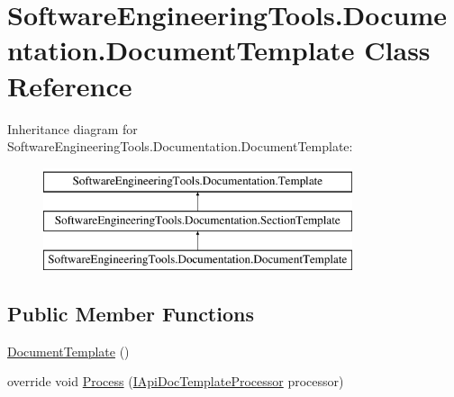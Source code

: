 \hypertarget{class_software_engineering_tools_1_1_documentation_1_1_document_template}{\section{Software\+Engineering\+Tools.\+Documentation.\+Document\+Template Class Reference}
\label{class_software_engineering_tools_1_1_documentation_1_1_document_template}
}
Inheritance diagram for Software\+Engineering\+Tools.\+Documentation.\+Document\+Template\+:\begin{figure}[H]
\begin{center}
\leavevmode
\includegraphics[height=3.000000cm]{class_software_engineering_tools_1_1_documentation_1_1_document_template}
\end{center}
\end{figure}
\subsection*{Public Member Functions}
\begin{DoxyCompactItemize}
\item 
\hyperlink{class_software_engineering_tools_1_1_documentation_1_1_document_template_a09ce6109fced0fda2af6f076a075fad6}{Document\+Template} ()
\item 
override void \hyperlink{class_software_engineering_tools_1_1_documentation_1_1_document_template_acaca4259f80cb3ee1b853f16c1965f04}{Process} (\hyperlink{interface_software_engineering_tools_1_1_documentation_1_1_i_api_doc_template_processor}{I\+Api\+Doc\+Template\+Processor} processor)
\end{DoxyCompactItemize}
